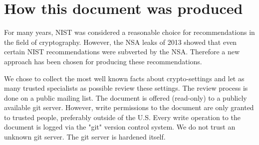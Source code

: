 \section{How this document was produced}

For many years, NIST was considered a reasonable choice for recommendations in
the field of cryptography. However, the NSA leaks of 2013 showed that even
certain NIST recommendations were
\cite{NSAEffortstoEvadeEncryptionTechnologyDamagedU.S.CryptographyStandard}{subverted
by the NSA}.  Therefore a new approach has been chosen for producing these
recommendations. 

We chose to collect the most well known facts about crypto-settings and let as
many trusted specialists as possible review these settings.  The review process
is done on a public mailing list. The document is offered (read-only) to a
publicly available git server. However, write permissions to the document are
only granted to trusted people, preferably outside of the U.S.  Every write
operation to the document is logged via the "git" version control system.  We
do not trust an unknown git server. The git server is hardened itself.


